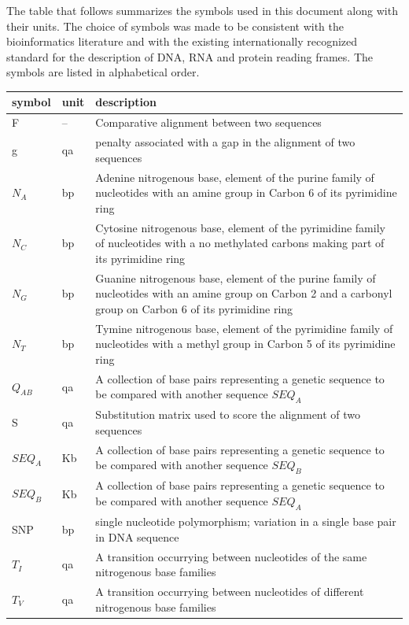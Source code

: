 \documentclass[12pt]{article}
\begin{document}
\vspace{1em}

The table that follows summarizes the symbols used in this document along with
their units.  The choice of symbols was made to be consistent with the bioinformatics
literature and with the existing internationally recognized standard for the description
 of DNA, RNA and protein reading frames. The symbols are listed in alphabetical order.

\renewcommand{\arraystretch}{1.2}
\noindent \begin{longtable*}{l l p{12cm}} \toprule
\textbf{symbol} & \textbf{unit} & \textbf{description}\\
\midrule 
  F & -- & Comparative alignment between two sequences
  \\
  g & qa & penalty associated with a gap in the alignment of two sequences
  \\
  $N_A$ & bp & Adenine nitrogenous base, element of the purine family of nucleotides with an amine group in Carbon 6 of its pyrimidine ring
  \\
  $N_C$ & bp & Cytosine nitrogenous base, element of the pyrimidine family of nucleotides with a no methylated carbons making part of its pyrimidine ring
  \\
  $N_G$ & bp & Guanine nitrogenous base, element of the purine family of nucleotides with an amine group on Carbon 2 and a carbonyl group on Carbon 6 of its pyrimidine ring
  \\
  $N_T$ & bp & Tymine nitrogenous base, element of the pyrimidine family of nucleotides with a methyl group in Carbon 5 of its pyrimidine ring
  \\
  $Q_{AB}$ & qa & A collection of base pairs representing a genetic sequence to be compared with another sequence $SEQ_A$
  \\
  S & qa & Substitution matrix used to score the alignment of two sequences
  \\
  $SEQ_A$ & Kb & A collection of base pairs representing a genetic sequence to be compared with another sequence $SEQ_B$
  \\
  $SEQ_B$ & Kb & A collection of base pairs representing a genetic sequence to be compared with another sequence $SEQ_A$
  \\
  SNP & bp & single nucleotide polymorphism; variation in a single base pair in DNA sequence
  \\
  $T_I$ & qa & A transition occurrying between nucleotides of the same nitrogenous base families
  \\
  $T_V$ & qa & A transition occurrying between nucleotides of different nitrogenous base families
  \\
\bottomrule
\end{longtable*}
\end{document}
